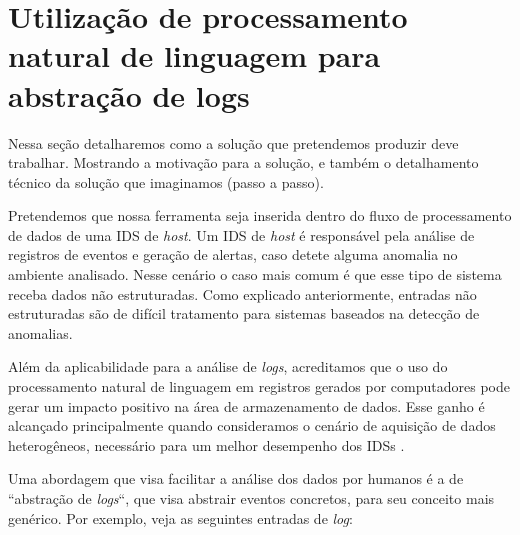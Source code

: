 \documentclass[
	12pt,				%
	openright,			%
	twoside,			%
	a4paper,			%
	english,			%
	spanish,			%
	brazil,				%
	]{abntex2}
\begin{document}



\chapter{Utilização de processamento natural de linguagem para abstração de logs}\label{chap:proposta}

Nessa seção detalharemos como a solução que pretendemos produzir deve trabalhar. Mostrando a motivação para a solução, e também o detalhamento técnico da solução que imaginamos (passo a passo).

Pretendemos que nossa ferramenta seja inserida dentro do fluxo de processamento de dados de uma IDS de \emph{host}. Um IDS de \emph{host} é responsável pela análise de registros de eventos e geração de alertas, caso detete alguma anomalia no ambiente analisado. Nesse cenário o caso mais comum é que esse tipo de sistema receba dados não estruturadas. Como explicado anteriormente, entradas não estruturadas são de difícil tratamento para sistemas baseados na detecção de anomalias.

Além da aplicabilidade para a análise de \emph{logs}, acreditamos que o uso do processamento natural de linguagem em registros gerados por computadores pode gerar um impacto positivo na área de armazenamento de dados. Esse ganho é alcançado principalmente quando consideramos o cenário de aquisição de dados heterogêneos, necessário para um melhor desempenho dos IDSs \cite{zuech2015intrusion}.

Uma abordagem que visa facilitar a análise dos dados por humanos é a de ``abstração de \emph{logs}``, que visa abstrair eventos concretos, para seu conceito mais genérico. Por exemplo, veja as seguintes entradas de \emph{log}:
\end{document}
